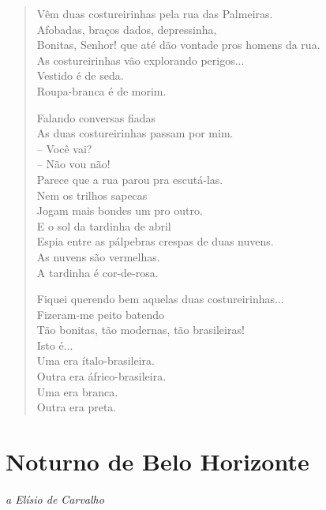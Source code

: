 \begin{verse}
Vêm duas costureirinhas pela rua das Palmeiras.\\
Afobadas, braços dados, depressinha,\\
Bonitas, Senhor! que até dão vontade pros homens da rua.\\
As costureirinhas vão explorando perigos...\\
Vestido é de seda.\\
Roupa-branca é de morim.

Falando conversas fiadas\\
As duas costureirinhas passam por mim.\\
-- Você vai?\\
\quad\quad{}-- Não vou não!\\
Parece que a rua parou pra escutá-las.\\
Nem os trilhos sapecas\\
Jogam mais bondes um pro outro.\\
E o sol da tardinha de abril\\
Espia entre as pálpebras crespas de duas nuvens.\\
As nuvens são vermelhas.\\
A tardinha é cor-de-rosa.

Fiquei querendo bem aquelas duas costureirinhas...\\
Fizeram-me peito batendo\\
Tão bonitas, tão modernas, tão brasileiras!\\
Isto é...\\
Uma era ítalo-brasileira.\\
Outra era áfrico-brasileira.\\
Uma era branca.\\
Outra era preta.
\end{verse}

\chapter[Noturno de Belo Horizonte]{Noturno de Belo Horizonte }

\begin{flushright}
\emph{a Elísio de Carvalho}
\end{flushright}

